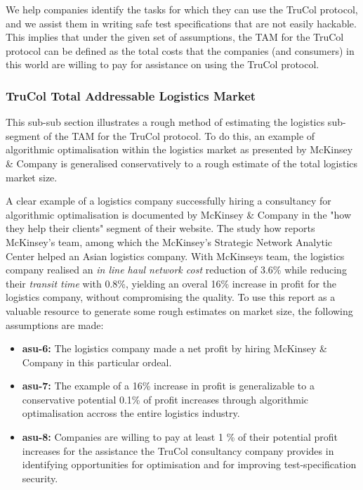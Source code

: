 We help companies identify the tasks for which they can use the TruCol protocol, and we assist them in writing safe test specifications that are not easily hackable. This implies that under the given set of assumptions, the TAM for the TruCol protocol can be defined as the total costs that the companies (and consumers) in this world are willing to pay for assistance on using the TruCol protocol. 

\subsubsection{TruCol Total Addressable Logistics Market}\label{subsubsec:tam_logistics}

This sub-sub section illustrates a rough method of estimating the logistics sub-segment of the TAM for the TruCol protocol. To do this, an example of algorithmic optimalisation within the logistics market as presented by McKinsey \& Company is generalised conservatively to a rough estimate of the total logistics market size.

A clear example of a logistics company successfully hiring a consultancy for algorithmic optimalisation is documented by McKinsey \& Company in the "how they help their clients" segment of their website\cite{mckinsey_algo}. The study how reports McKinsey's team, among which the McKinsey's Strategic Network Analytic Center helped an Asian logistics company. With McKinseys team, the logistics company realised an \textit{in line haul network cost} reduction of 3.6\% while reducing their \textit{transit time} with 0.8\%, yielding an overal 16\% increase in profit for the logistics company, without compromising the quality. To use this report as a valuable resource to generate some rough estimates on market size, the following assumptions are made:

 \begin{itemize}
 	\item \textbf{asu-6:} The logistics company made a net profit by hiring McKinsey \& Company in this particular ordeal.
	\item \textbf{asu-7:} The example of a 16\% increase in profit is generalizable to a conservative potential 0.1\% of profit increases through algorithmic optimalisation accross the entire logistics industry.
	\item \textbf{asu-8:} Companies are willing to pay at least 1 \% of their potential profit increases for the assistance the TruCol consultancy company provides in identifying opportunities for optimisation and for improving test-specification security.
\end{itemize}

